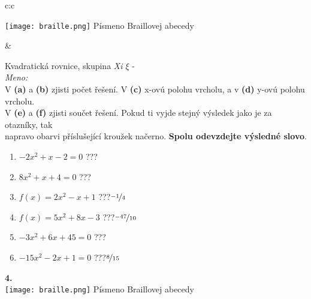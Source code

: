 \documentclass[10pt]{report}
\begin{document}
\begin{tabular}{c:c}
\begin{minipage}[c][99mm][t]{0.49\linewidth}
\begin{center}
\begin{minipage}{0.20\linewidth}
\begin{center}
\texttt{[image: braille.png]}
{\small Písmeno Braillovej abecedy}
\end{center}
\end{minipage}
\end{center}
\end{minipage}
&
\begin{minipage}[c][99mm][t]{0.49\linewidth}
\begin{center}
\vspace{7mm}
{\huge Kvadratická rovnice, skupina \textit{Xi $\xi$} -}\\[4.5mm]
\textit{Meno:}\phantom{xxxxxxxxxxxxxxxxxxxxxxxxxxxxxxxxxxxxxxxxxxxxxxxxxxxxxxxxxxxxxxxxx}\\[3.5mm]
V \textbf{(a)} a \textbf{(b)} zjisti počet řešení. V \textbf{(c)} x-ovú polohu vrcholu, a v \textbf{(d)} y-ovú polohu vrcholu.\\V \textbf{(e)} a \textbf{(f)} zjisti součet řešení. Pokud ti vyjde stejný výsledek jako je za otazníky, tak\\napravo obarvi příslušející kroužek načerno. \textbf{Spolu odevzdejte výsledné slovo}.\\[3mm]
\begin{minipage}{0.77\linewidth}
\begin{center}
\begin{varwidth}{\textwidth}
\begin{enumerate}
\large
\item $-2x^2+x-2=0$\quad \dotfill\; ???\;\dotfill {}
\item $8x^2+x+4=0$\quad \dotfill\; ???\;\dotfill {}
\item $f(x)=2x^2-x+1$\quad \dotfill\; ???\;\dotfill \quad $\nicefrac{-1}{4}$
\item $f(x)=5x^2+8x-3$\quad \dotfill\; ???\;\dotfill \quad $\nicefrac{-47}{10}$
\item $-3x^2+6x+45=0$\quad \dotfill\; ???\;\dotfill {}
\item $-15x^2-2x+1=0$\quad \dotfill\; ???\;\dotfill \quad $\nicefrac{8}{15}$
\end{enumerate}
\end{varwidth}
\end{center}
\end{minipage}
\begin{minipage}{0.20\linewidth}
\begin{center}
{\Huge\bfseries 4.} \\[2mm]
\texttt{[image: braille.png]}
{\small Písmeno Braillovej abecedy}
\end{center}
\end{minipage}
\end{center}
\end{minipage}

\end{tabular}
\end{document}

